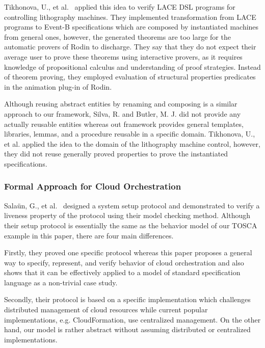 \documentclass[12pt]{report}
\begin{document}
Tikhonova, U., et al.~\cite{TikhonovaMBAV13} applied this idea to
verify LACE DSL programs for controlling lithography machines. They
implemented transformation from LACE programs to Event-B
specifications which are composed by instantiated machines from
general ones, however, the generated theorems are too large for the
automatic provers of Rodin to discharge. They say that they do not
expect their average user to prove these theorems using interactive
provers, as it requires knowledge of propositional calculus and
understanding of proof strategies. Instead of theorem proving, they
employed evaluation of structural properties predicates in the
animation plug-in of Rodin.

Although reusing abstract entities by renaming and composing is a
similar approach to our framework, Silva, R. and Butler, M. J. did not
provide any actually reusable entities whereas out framework provides
general templates, libraries, lemmas, and a procedure reusable in a
specific domain. Tikhonova, U., et al. applied the idea to the domain
of the lithography machine control, however, they did not reuse
generally proved properties to prove the instantiated specifications.

\subsubsection{Formal Approach for Cloud Orchestration}
Sala{\"u}n, G., et al.~\cite{EtcheversCBP11, SalaunBCPEG13,
  SalaunEPBC13} designed a system setup protocol and demonstrated to
verify a liveness property of the protocol using their model checking
method. Although their setup protocol is essentially the same as the
behavior model of our TOSCA example in this paper, there are four main
differences.

Firstly, they proved one specific protocol whereas this paper proposes
a general way to specify, represent, and verify behavior of cloud
orchestration and also shows that it can be effectively applied to a
model of standard specification language as a non-trivial case study.

Secondly, their protocol is based on a specific implementation which
challenges distributed management of cloud resources while current
popular implementations, e.g. CloudFormation, use centralized
management. On the other hand, our model is rather abstract without
assuming distributed or centralized implementations.
\end{document}
